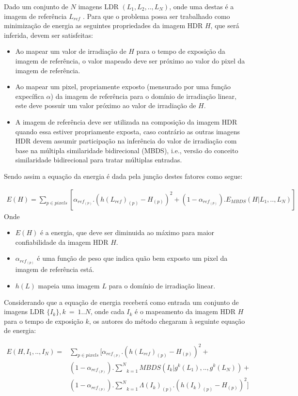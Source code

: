 Dado um conjunto de $N$ imagens LDR $(L_1,L_2,..,L_N)$, onde uma destas é a imagem de referência $L_{ref}$ . Para que o problema possa ser trabalhado como minimização de energia as seguintes propriedades da imagem HDR $H$, que será inferida, devem ser satisfeitas:

\begin{itemize}
	\item Ao mapear um valor de irradiação de $H$ para o tempo de exposição da imagem de referência, o valor mapeado deve ser próximo ao valor do pixel da imagem de referência.
	\item Ao mapear um pixel, propriamente exposto (mensurado por uma função expecífica $\alpha$) da imagem de referência para o domínio de irradiação linear, este deve possuir um valor próximo ao valor de irradiação de $H$.
	\item A imagem de referência deve ser utilizada na composição da imagem HDR quando essa estiver propriamente exposta, caso contrário as outras imagens HDR devem assumir participação na inferência do valor de irradiação com base na múltipla similaridade bidirecional (MBDS), i.e., versão do conceito similaridade bidirecional para tratar múltiplas entradas.
\end{itemize}

Sendo assim a equação da energia é dada pela junção destes fatores como segue:
 
\begin{align} \label{eqSenEnergia}
	E(H) = \sum\limits_{p \in pixels}{[\alpha_{ref_{(p)}}.(h(L_{ref})_{(p)} - H_{(p)})^2 + (1-\alpha_{ref_(p)}).E_{MBDS}(H|L_1,..,L_N)]}
\end{align}
Onde
\begin{itemize}
	\item $E(H)$ é a energia, que deve ser diminuida ao máximo para maior confiabilidade da imagem HDR $H$.
	\item $\alpha_{ref_{(p)}}$ é uma função de peso que indica quão bem exposto um pixel da imagem de referência está.
	\item $h(L)$ mapeia uma imagem $L$ para o domínio de irradiação linear. 
\end{itemize}

Considerando que a equação de energia receberá como entrada um conjunto de imagens LDR $\{I_k\}, k~=~1..N$, onde cada $I_k$ é o mapeamento da imagem HDR $H$ para o tempo de exposição $k$, os autores do método chegaram à seguinte equação de energia:

\begin{equation} \label{eqSenEnergia2}
\begin{split}
	E(H,I_1,..,I_N) = &\underset{p \in pixels}{\sum{}}[\alpha_{ref_{(p)}}.(h(L_{ref})_{(p)} - H_{(p)})^2 +\\
		   &(1-\alpha_{ref_(p)}).\underset{k=1}{\overset{N}{\sum{}}}MBDS(I_k|g^k(L_1),..,g^k(L_N)) +\\
		   &(1-\alpha_{ref_(p)}).\underset{k=1}{\overset{N}{\sum{}}}\Lambda(I_k)_{(p)}.(h(I_k)_{(p)} - H_{(p)})^2]
\end{split}
\end{equation}


